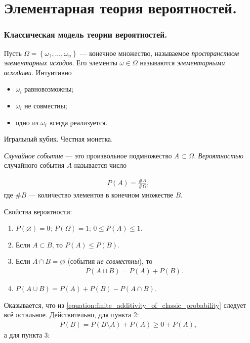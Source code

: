
\part{Элементарная теория вероятностей.}
\section{Классическая модель теории вероятностей.}

\begin{df*}
 Пусть $\Omega = \left\{ \omega_1, \ldots, \omega_n \right\}$ --- конечное множество, называемое \textit{пространством элементарных исходов}. Его элементы $ \omega \in \Omega $ называются \textit{элементарными исходами}. Интуитивно
 \begin{itemize}
  \item $\omega_i$ равновозможны;
  \item $\omega_i$ не совместны;
  \item одно из $\omega_i$ всегда реализуется.
 \end{itemize}
\end{df*}
\begin{exmpl*}
 Игральный кубик. Честная монетка.
\end{exmpl*}

\begin{df}
 \textit{Случайное событие}  --- это произвольное подмножество $A \subset \Omega$. \textit{Вероятностью} случайного события $A$ называется число

 \begin{align*}
  P(A) = \frac{\# A}{\# \Omega}
 ,\end{align*} где $\# B$ --- количество элементов в конечном множестве $B$.
\end{df}

\begin{prop*}
 Свойства вероятности:
 \begin{enumerate}
  \item $P(\varnothing) = 0$; $P(\Omega) = 1$; $0 \leqslant P(A) \leqslant 1$.
  \item Если $A \subset B$, то $P(A) \leqslant P(B)$.
  \item Если $A \cap B = \varnothing$ (события \textit{не совместны}), то
   \begin{align}
    \label{equation:finite_additivity_of_classic_probability}
    P(A \sqcup B) = P(A) + P(B)
   .\end{align} 
  \item $P(A \cup B) = P(A) + P(B) - P(A \cap B)$.
 \end{enumerate}
\end{prop*}
Оказывается, что из \eqref{equation:finite_additivity_of_classic_probability} следует всё остальное. Действительно, для пункта 2:
\begin{align*}
 P(B) = P(B \setminus A) + P(A) \geqslant 0 + P(A),
\end{align*}  а для пункта 3:

